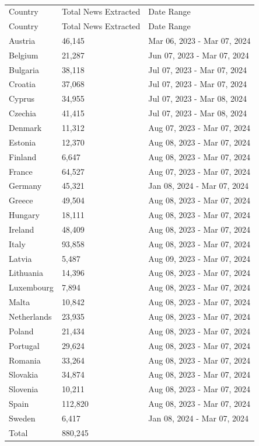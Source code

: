 \documentclass[
]{agujournal2019}
\begin{document}
\begin{longtable}[]{@{}lll@{}}

\caption{\label{tbl-extraction}Total news extracted per country}

\tabularnewline

\caption{}\label{T_1f17c}\tabularnewline
\toprule\noalign{}
Country & Total News Extracted & Date Range \\
\midrule\noalign{}
\endfirsthead
\toprule\noalign{}
Country & Total News Extracted & Date Range \\
\midrule\noalign{}
\endhead
\bottomrule\noalign{}
\endlastfoot
Austria & 46,145 & Mar 06, 2023 - Mar 07, 2024 \\
Belgium & 21,287 & Jun 07, 2023 - Mar 07, 2024 \\
Bulgaria & 38,118 & Jul 07, 2023 - Mar 07, 2024 \\
Croatia & 37,068 & Jul 07, 2023 - Mar 07, 2024 \\
Cyprus & 34,955 & Jul 07, 2023 - Mar 08, 2024 \\
Czechia & 41,415 & Jul 07, 2023 - Mar 08, 2024 \\
Denmark & 11,312 & Aug 07, 2023 - Mar 07, 2024 \\
Estonia & 12,370 & Aug 08, 2023 - Mar 07, 2024 \\
Finland & 6,647 & Aug 08, 2023 - Mar 07, 2024 \\
France & 64,527 & Aug 07, 2023 - Mar 07, 2024 \\
Germany & 45,321 & Jan 08, 2024 - Mar 07, 2024 \\
Greece & 49,504 & Aug 08, 2023 - Mar 07, 2024 \\
Hungary & 18,111 & Aug 08, 2023 - Mar 07, 2024 \\
Ireland & 48,409 & Aug 08, 2023 - Mar 07, 2024 \\
Italy & 93,858 & Aug 08, 2023 - Mar 07, 2024 \\
Latvia & 5,487 & Aug 09, 2023 - Mar 07, 2024 \\
Lithuania & 14,396 & Aug 08, 2023 - Mar 07, 2024 \\
Luxembourg & 7,894 & Aug 08, 2023 - Mar 07, 2024 \\
Malta & 10,842 & Aug 08, 2023 - Mar 07, 2024 \\
Netherlands & 23,935 & Aug 08, 2023 - Mar 07, 2024 \\
Poland & 21,434 & Aug 08, 2023 - Mar 07, 2024 \\
Portugal & 29,624 & Aug 08, 2023 - Mar 07, 2024 \\
Romania & 33,264 & Aug 08, 2023 - Mar 07, 2024 \\
Slovakia & 34,874 & Aug 08, 2023 - Mar 07, 2024 \\
Slovenia & 10,211 & Aug 08, 2023 - Mar 07, 2024 \\
Spain & 112,820 & Aug 08, 2023 - Mar 07, 2024 \\
Sweden & 6,417 & Jan 08, 2024 - Mar 07, 2024 \\
Total & 880,245 & \\

\end{longtable}
\end{document}
